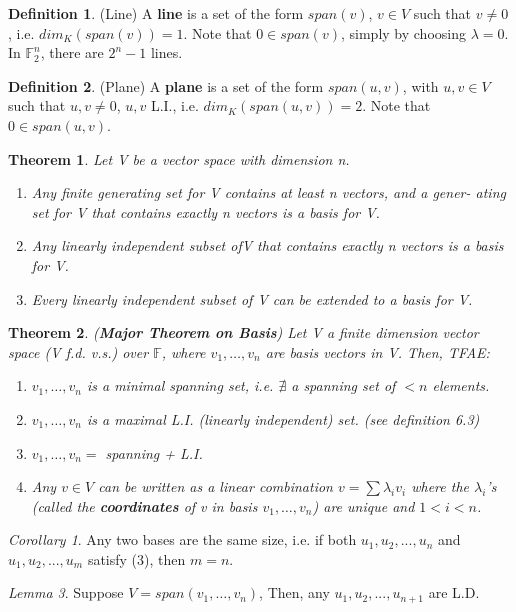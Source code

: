 \documentclass[12pt]{article}
\newtheorem{theorem}{Theorem}[section]
\theoremstyle{definition}
\newtheorem{definition}{Definition}[section]
\theoremstyle{remark}
\newtheorem{corollary}{Corollary}[theorem]
\newtheorem{lemma}[theorem]{Lemma}
\begin{document}
    \begin{definition}(Line)
        A \textbf{line} is a set of the form $span(v)$, $v \in V$ such that
        $v\neq 0$, i.e. $dim_K (span(v))=1$. Note that $0\in span(v)$, simply by choosing $\lambda =0$. In $\mathbb{F}_2^n$, there are $2^n-1$ lines. 
    \end{definition}
    \begin{definition}(Plane)
        A \textbf{plane} is a set of the form $span(u,v)$, with $u,v \in V$ such that $u,v\neq 0$, $u,v$ L.I., 
        i.e. $dim_K (span(u,v))=2$. Note that $0\in span(u,v)$.
    \end{definition}
    \begin{theorem}
        Let V be a vector space with dimension n.
        \begin{enumerate}
            \item Any finite generating set for V contains at least n vectors, and a gener-
            ating set for V that contains exactly n vectors is a basis for V.
            \item Any linearly independent subset ofV that contains exactly n vectors is a basis for V.
            \item Every linearly independent subset of V can be extended to a basis for V.
        \end{enumerate}
    \end{theorem}
    \begin{theorem}(\textbf{Major Theorem on Basis})
        Let V a finite dimension vector space (V f.d. v.s.) over $\mathbb{F}$, where $v_1, \hdots, v_n$
        are basis vectors in V. Then, TFAE:
        \begin{enumerate}
            \item $v_1, \hdots, v_n$ is a minimal spanning set, i.e. $\nexists$ a spanning set of $<n$ elements.
            \item $v_1, \hdots, v_n$ is a maximal L.I. (linearly independent) set. (see definition 6.3)
            \item $v_1, \hdots, v_n=$ spanning + L.I.
            \item Any $v\in V$ can be written as a linear combination $v=\sum \lambda_iv_i$ where the 
            $\lambda_i$'s (called the \textbf{coordinates} of v in basis $v_1, \hdots, v_n$) are unique and $1<i<n$. 
        \end{enumerate}
    \end{theorem}
    \begin{corollary}
        Any two bases are the same size, i.e. if both ${u_1,u_2,... ,u_n}$ and ${u_1,u_2,... ,u_m}$ satisfy (3), then $m = n$.
    \end{corollary}
    \begin{lemma}
        Suppose $V=span(v_1, \hdots, v_n)$, Then, any ${u_1,u_2,... ,u_{n+1}}$ are L.D. 
    \end{lemma}
\end{document}
